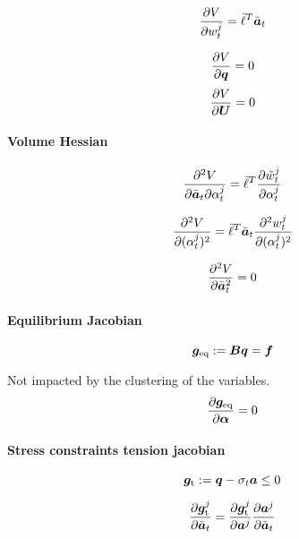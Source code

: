 \begin{equation}
    \frac{\partial V}{\partial w_t^j} = \bar{\ell}^T \bar{\bm{a}}_t
\end{equation}

\begin{equation}
    \frac{\partial V}{\partial\bm{q}}=0
\end{equation}
\begin{equation}
    \frac{\partial V}{\partial\bm{U}}=0
\end{equation}


\paragraph*{Volume Hessian} 

\begin{equation}
    \frac{\partial^2V}{\partial{\bar{\bm{a}}_t}\partial\alpha_t^j} = \bar{\ell}^T \frac{\partial\tilde{w}_t^j}{\partial\alpha_t^j}
\end{equation}

\begin{equation}
    \frac{\partial^2V}{\partial(\alpha_t^j)^2} = \bar{\ell}^T \bar{\bm{a}}_t \frac{\partial^2w_t^j}{\partial(\alpha_t^j)^2}
\end{equation}

\begin{equation}
    \frac{\partial^2V}{\partial{\bar{\bm{a}}_t}^2} = 0
\end{equation}

\paragraph*{Equilibrium Jacobian}
\begin{equation}
    \bm{g}_\text{eq}:=\bm{B}\bm{q} = \bm{f}
\end{equation}

Not impacted by the clustering of the variables.
\begin{equation}
    \frac{\partial\bm{g}_\text{eq}}{\partial\bm{\alpha}}=0
\end{equation}

\paragraph*{Stress constraints tension jacobian}

\begin{equation}
    \bm{g}_\text{t}:=\bm{q} -\sigma_t\bm{a} \leq 0
\end{equation}

\begin{equation}
    \frac{\partial\bm{g}_\text{t}^j}{\partial\bar{\bm{a}}_t} = \frac{\partial\bm{g}_\text{t}^j}{\partial{\bm{a}^j}} \frac{\partial\bm{a}^j}{\partial\bar{\bm{a}}_t}
\end{equation}

